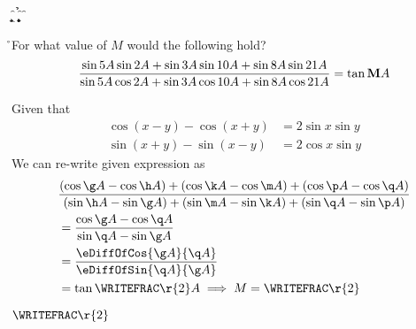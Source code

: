 

\MAX\va\vb\a
\MIN\va\vb\b
\MAX\vc\vd\c
\MIN\vc\vd\d
\MAX\ve\vf\e
\MIN\ve\vf\f

\SUBTRACT\a\b\g
\ADD\a\b\h
\SUBTRACT\c\d\k
\ADD\c\d\m
\SUBTRACT\e\f\p
\ADD\e\f\q

\ADD\q\g\r

\question[4] For what value of $M$ would the following hold?
\[ \dfrac{\sin5 A\sin2 A + \sin3 A\sin10 A + \sin8 A\sin21 A}
{\sin5 A\cos2 A + \sin3 A\cos10 A + \sin8 A\cos21 A} = \tan\textbf{M}A\]

\watchout

\begin{explanation}[\fullpage]
  Given that 
  \begin{align}
    \cos(x-y)-\cos(x+y) &= 2\sin x\sin y \\
    \sin(x+y) - \sin(x-y) &= 2\cos x\sin y
  \end{align}
  We can re-write given expression as 
  \begin{align}
    &\dfrac{(\cos\g A - \cos\h A) + (\cos\k A - \cos\m A) + (\cos\p A - \cos\q A)}
    {(\sin\h A - \sin\g A) + (\sin\m A - \sin\k A) + (\sin\q A - \sin\p A)} \nonumber\\
    &= \dfrac{\cos\g A - \cos\q A}{\sin\q A - \sin\g A}  \\
    &= \dfrac{\eDiffOfCos{\g A}{\q A}}{\eDiffOfSin{\q A}{\g A}} \\
    &= \tan\WRITEFRAC\r{2} A \implies M = \WRITEFRAC\r{2}
  \end{align}
\end{explanation}

\ifprintanswers\begin{codex}$\WRITEFRAC\r{2}$\end{codex}\fi
